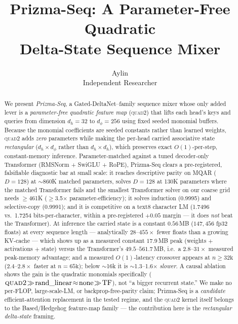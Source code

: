 \documentclass[11pt]{article}
\title{\textbf{Prizma-Seq: A Parameter-Free Quadratic\\ Delta-State Sequence Mixer}}
\author{Aylin\\ \small Independent Researcher}
\date{}
\newcommand{\dphi}{d_{\phi}}
\newcommand{\dhd}{d_{h}}
\newcommand{\quadtwo}{\textsc{quad2}}
\begin{document}
\maketitle

\begin{abstract}
We present \emph{Prizma-Seq}, a Gated-DeltaNet--family sequence mixer whose only added lever is
a \emph{parameter-free quadratic feature map} (\quadtwo) that lifts each head's keys and queries
from dimension $\dhd{=}32$ to $\dphi{=}256$ using fixed seeded monomial buffers. Because the
monomial coefficients are seeded constants rather than learned weights, \quadtwo{} adds
\emph{zero} parameters while making the per-head carried associative state \emph{rectangular}
($\dhd\times\dphi$ rather than $\dhd\times\dhd$), which preserves exact $O(1)$-per-step,
constant-memory inference. Parameter-matched against a tuned decoder-only Transformer
(RMSNorm + SwiGLU + RoPE), Prizma-Seq clears a pre-registered, falsifiable diagnostic bar at small
scale: it reaches descriptive parity on MQAR ($D{=}128$) at $\sim$860K matched parameters, solves
$D{=}128$ at 130K parameters where the matched Transformer fails and the smallest Transformer
solver on our coarse grid needs $\geq$461K ($\geq$3.5$\times$ parameter-efficiency); it solves
induction (0.9995) and selective-copy (0.9991); and it is competitive on a text8 character LM
(1.7496 vs.\ 1.7254 bits-per-character, within a pre-registered $+0.05$ margin --- it does
\emph{not} beat the Transformer). At inference the carried state is a constant $0.56$\,MB ($147{,}456$ fp32 floats) at every
sequence length --- analytically $28$--$455\times$ fewer floats than a growing KV-cache --- which
shows up as a measured constant $17.9$\,MB peak (weights $+$ activations $+$ state) versus the
Transformer's $49.5$--$561.7$\,MB, i.e.\ a $2.8$--$31\times$ measured peak-memory advantage; and a
measured $O(1)$-latency crossover appears at $n{\geq}32\text{k}$ ($2.4$--$2.8\times$ faster at
$n{=}65\text{k}$); below $\sim$16k it is $\sim$1.3--1.6$\times$ \emph{slower}. A causal ablation shows the gain is the quadratic
monomials specifically ($\quadtwo\!\gg\!\text{rand\_linear}\!\approx\!\text{none}\!\gg\!\text{TF}$),
not ``a bigger recurrent state.'' We make no per-FLOP, large-scale-LM, or backprop-free-parity
claim; Prizma-Seq is a \emph{candidate} efficient-attention replacement in the tested regime, and
the \quadtwo{} kernel itself belongs to the Based/Hedgehog feature-map family --- the contribution
here is the \emph{rectangular delta-state} framing.
\end{abstract}
\end{document}
